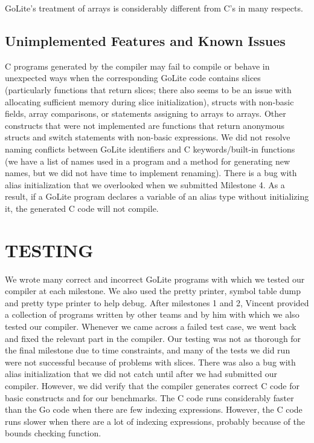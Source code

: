 \documentclass[11pt]{article}
\begin{document}
GoLite's treatment of arrays is considerably different from C's in many respects. 


\subsection{Unimplemented Features and Known Issues}
C programs generated by the compiler may fail to compile or behave in unexpected ways when the corresponding GoLite code contains slices (particularly functions that return slices; there also seems to be an issue with allocating sufficient memory during slice initialization), structs with non-basic fields, array comparisons, or statements assigning to arrays to arrays. Other constructs that were not implemented are functions that return anonymous structs and switch statements with non-basic expressions. We did not resolve naming conflicts between GoLite identifiers and C keywords/built-in functions (we have a list of names used in a program and a method for generating new names, but we did not have time to implement renaming). There is a bug with alias initialization that we overlooked when we submitted Milestone 4. As a result, if a GoLite program declares a variable of an alias type without initializing it, the generated C code will not compile.


\section{TESTING}
We wrote many correct and incorrect GoLite programs with which we tested our compiler at each milestone. We also used the pretty printer, symbol table dump and pretty type printer to help debug. After milestones 1 and 2, Vincent provided a collection of programs written by other teams and by him with which we also tested our compiler. Whenever we came across a failed test case, we went back and fixed the relevant part in the compiler. Our testing was not as thorough for the final milestone due to time constraints, and many of the tests we did run were not successful because of problems with slices. There was also a bug with alias initialization that we did not catch until after we had submitted our compiler. However, we did verify that the compiler generates correct C code for basic constructs and for our benchmarks. The C code runs considerably faster than the Go code when there are few indexing expressions. However, the C code runs slower when there are a lot of indexing expressions, probably because of the bounds checking function.
\end{document}
